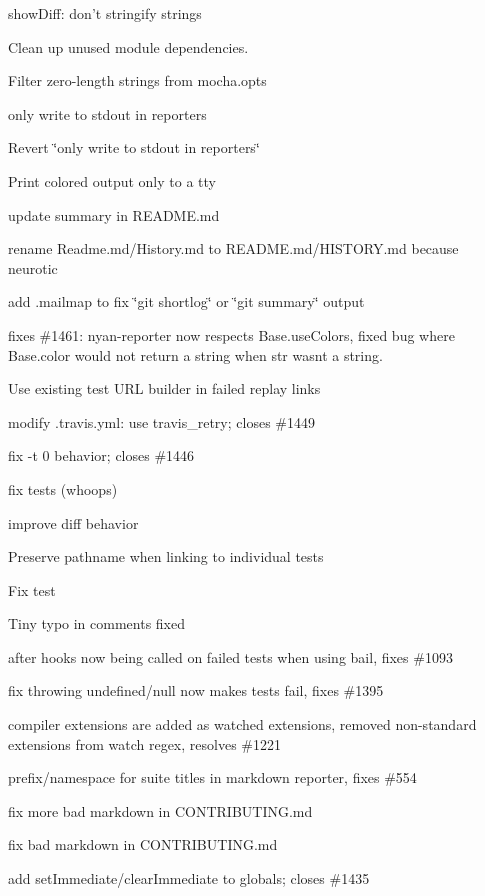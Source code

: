 \begin{DoxyItemize}
\item show\+Diff\+: don’t stringify strings
\item Clean up unused module dependencies.
\item Filter zero-\/length strings from mocha.\+opts
\item only write to stdout in reporters
\item Revert \char`\"{}only write to stdout in reporters\char`\"{}
\item Print colored output only to a tty
\item update summary in R\+E\+A\+D\+M\+E.\+md
\item rename Readme.\+md/\+History.md to R\+E\+A\+D\+M\+E.\+md/\+H\+I\+S\+T\+O\+RY.md because neurotic
\item add .mailmap to fix \char`\"{}git shortlog\char`\"{} or \char`\"{}git summary\char`\"{} output
\item fixes \#1461\+: nyan-\/reporter now respects Base.\+use\+Colors, fixed bug where Base.\+color would not return a string when str wasn\textquotesingle{}t a string.
\item Use existing test U\+RL builder in failed replay links
\item modify .travis.\+yml\+: use travis\+\_\+retry; closes \#1449
\item fix -\/t 0 behavior; closes \#1446
\item fix tests (whoops)
\item improve diff behavior
\item Preserve pathname when linking to individual tests
\item Fix test
\item Tiny typo in comments fixed
\item after hooks now being called on failed tests when using bail, fixes \#1093
\item fix throwing undefined/null now makes tests fail, fixes \#1395
\item compiler extensions are added as watched extensions, removed non-\/standard extensions from watch regex, resolves \#1221
\item prefix/namespace for suite titles in markdown reporter, fixes \#554
\item fix more bad markdown in C\+O\+N\+T\+R\+I\+B\+U\+T\+I\+N\+G.\+md
\item fix bad markdown in C\+O\+N\+T\+R\+I\+B\+U\+T\+I\+N\+G.\+md
\item add set\+Immediate/clear\+Immediate to globals; closes \#1435

\end{DoxyItemize}

